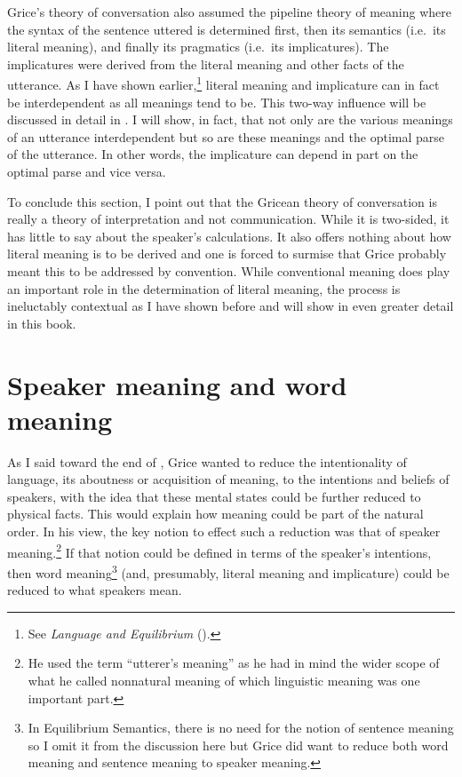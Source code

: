 Grice's theory of conversation also assumed the pipeline theory of meaning where the syntax of the sentence uttered is determined first, then its semantics (i.e.\ its literal meaning), and finally its pragmatics (i.e.\ its implicatures). The implicatures were derived from the literal meaning and other facts of the utterance. As I have shown earlier,\footnote{See \emph{Language and Equilibrium} (\citeyear[Section~4.6]{parikh:le}).} literal meaning and implicature can in fact be interdependent as all meanings tend to be. This two-way influence will be discussed in detail in . I will show, in fact, that not only are the various meanings of an utterance interdependent but so are these meanings and the optimal parse of the utterance. In other words, the implicature can depend in part on the optimal parse and vice versa.

To conclude this section, I point out that the Gricean theory of conversation is really a theory of interpretation and not communication. While it is two-sided, it has little to say about the speaker's calculations. It also offers nothing about how literal meaning is to be derived and one is forced to surmise that Grice probably meant this to be addressed by convention. While conventional meaning does play an important role in the determination of literal meaning, the process is ineluctably contextual as I have shown before and will show in even greater detail in this book.


\section{Speaker meaning and word meaning} \label{sec:speaker meaning and word meaning}

As I said toward the end of , Grice wanted to reduce the intentionality of language, its aboutness or acquisition of meaning, to the intentions and beliefs of speakers, with the idea that these mental states could be further reduced to physical facts. This would explain how meaning could be part of the natural order. In his view, the key notion to effect such a reduction was that of speaker meaning.\footnote{He used the term ``utterer's meaning'' as he had in mind the wider scope of what he called nonnatural meaning of which linguistic meaning was one important part.} If that notion could be defined in terms of the speaker's intentions, then word meaning\footnote{In Equilibrium Semantics, there is no need for the notion of sentence meaning so I omit it from the discussion here but Grice did want to reduce both word meaning and sentence meaning to speaker meaning.}  (and, presumably, literal meaning and implicature) could be reduced to what speakers mean.

